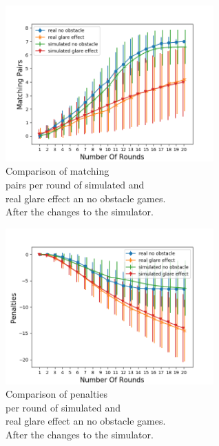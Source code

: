 \begin{minipage}{0.5\textwidth}
	\begin{figure}[H]
		\centering
		\includegraphics[width=8cm]{images/simulationOptimized1.png}
		\caption[Comparison of matching pairs per round of simulated and real glare effect an no obstacle games. After the changes to the simulator.]{Comparison of matching \\\hspace{0\textwidth}pairs per round of simulated and \\\hspace{0\textwidth}real glare effect an no obstacle games.\\\hspace{0\textwidth} After the changes to the simulator.}
		\label{fig:simOp1}
	\end{figure}
\end{minipage}
\begin{minipage}{0.5\textwidth}
	\begin{figure}[H]
		
		\includegraphics[width=8cm]{images/simulationOptimized2.png}
		\centering
		\caption[Comparison of penalties per round of simulated and real glare effect an no obstacle games. After the changes to the simulator.]{Comparison of penalties\\\hspace{0\textwidth} per round of simulated and\\\hspace{0\textwidth} real glare effect an no obstacle games.\\\hspace{0\textwidth} After the changes to the simulator.}
		\label{fig:simOp2}
	\end{figure}
\end{minipage} 

